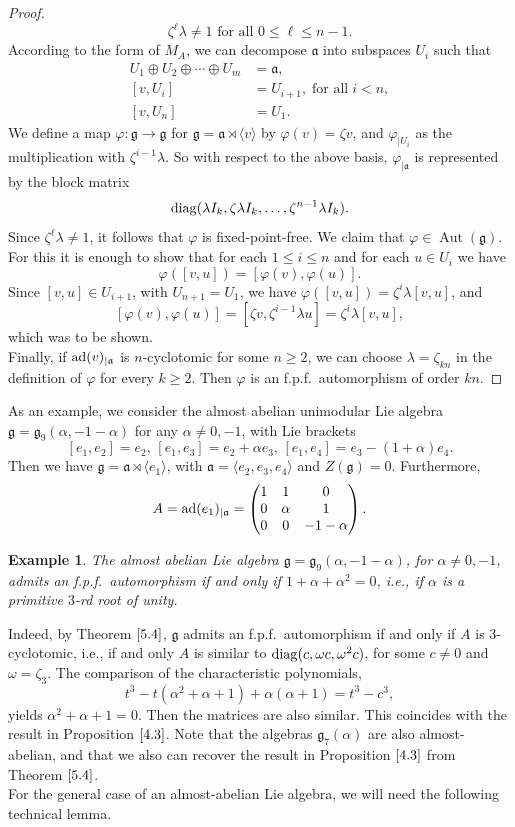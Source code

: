 \documentclass[12pt]{amsart}
\newtheorem{ex}[thm]{Example}
\theoremstyle{definition}
\theoremstyle{remark}
\DeclareMathOperator{\Aut}{Aut}
\newcommand{\ad}{{\rm ad}}
\newcommand{\diag}{\mathop{\rm diag}}
\newcommand{\La}{\mathfrak{a}}
\newcommand{\Lg}{\mathfrak{g}}
\newcommand{\al}{\alpha}
\newcommand{\la}{\lambda}
\newcommand{\om}{\omega}
\newcommand{\ra}{\rightarrow}
\renewcommand{\phi}{\varphi}
\begin{document}
\begin{proof}
\[
\zeta^{\ell}\la\neq 1 \text{ for all } 0\le \ell \le n-1.
\]
According to the form of $M_A$, we can decompose $\La$ into subspaces $U_i$ such that
\begin{align*}
U_1\oplus U_2\oplus \cdots \oplus U_m & = \La, \\
[v,U_i] & = U_{i+1},\; \text{for all} \; i<n,\\
[v,U_n] & = U_1.
\end{align*}
We define a map $\phi\colon \Lg\ra \Lg$ for $\Lg=\La\rtimes \langle v\rangle$ by $\phi(v)=\zeta v$, and
$\phi_{\mid U_i}$ as the multiplication with $\zeta^{i-1}\la$. So with respect to the above basis, $\phi_{\mid \La}$
is represented by the block matrix
\[
{\rm diag}(\la I_k,\zeta \la I_k,\ldots ,\zeta^{n-1}\la I_k).
\]
Since $\zeta^{\ell}\la\neq 1$, it follows that $\phi$ is fixed-point-free. We claim that
$\phi\in \Aut(\Lg)$. For this it is enough to show that for
each $1\le i\le n$ and for each $u\in U_i$
we have
\[
\phi([v,u])=[\phi(v),\phi(u)].
\]
Since $[v,u]\in U_{i+1}$, with $U_{n+1}=U_1$, we have $\phi([v,u])=\zeta^i\la [v,u]$, and
\[
[\phi(v),\phi(u)]=[\zeta v,\zeta^{i-1}\la u]=\zeta^i\la [v,u],
\]
which was to be shown. \\[0.2cm]
Finally, if $\ad(v)_{\mid \La}$ is $n$-cyclotomic for some $n\ge 2$, we can choose 
$\la=\zeta_{kn}$ in the definition of $\phi$ for every $k\ge 2$. Then
$\phi$ is an f.p.f.\ automorphism of order $kn$. 
\end{proof}  

As an example, we consider the almost abelian unimodular Lie algebra $\Lg=\Lg_9(\al,-1-\al)$ 
for any $\al\neq 0, -1$, with Lie brackets
\[
[e_1,e_2]=e_2,\, [e_1,e_3]=e_2+\al e_3,\, [e_1,e_4]=e_3-(1+\al) e_4.
\]
Then we have $\Lg=\La\rtimes \langle e_1\rangle$, with $\La=\langle e_2,e_3,e_4\rangle$ and $Z(\Lg)=0$.
Furthermore,
\[
A=\ad (e_1)_{\mid \La}=\begin{pmatrix} 1 & 1 & 0 \cr 0 & \al & 1 \cr 0 & 0 & -1-\al \end{pmatrix}.
\]  

\begin{ex}
The almost abelian Lie algebra $\Lg=\Lg_9(\al,-1-\al)$, for $\al\neq 0,-1$, admits an f.p.f.\ automorphism if and only if
$1+\al+\al^2=0$, i.e., if $\al$ is a primitive $3$-rd root of unity.  
\end{ex}  

Indeed, by Theorem $\ref{5.4}$, $\Lg$ admits an f.p.f.\ automorphism if and only if $A$ is $3$-cyclotomic, i.e.,
if and only $A$ is similar to $\diag(c,\om c,\om^2 c)$, for some $c\neq 0$ and $\om=\zeta_3$. The comparison of
the characteristic polynomials, 
\[
t^3-t(\al^2+\al+1)+\al(\al+1)= t^3-c^3,
\]
yields $\al^2+\al+1=0$. Then the matrices are also similar. This coincides with the result in Proposition $\ref{4.3}$.
Note that the algebras $\Lg_7(\al)$ are also almost-abelian, and that we also can recover the result in Proposition $\ref{4.3}$
from Theorem $\ref{5.4}$. \\[0.2cm]
For the general case of an almost-abelian Lie algebra, we will need the following technical lemma.
\end{document}
